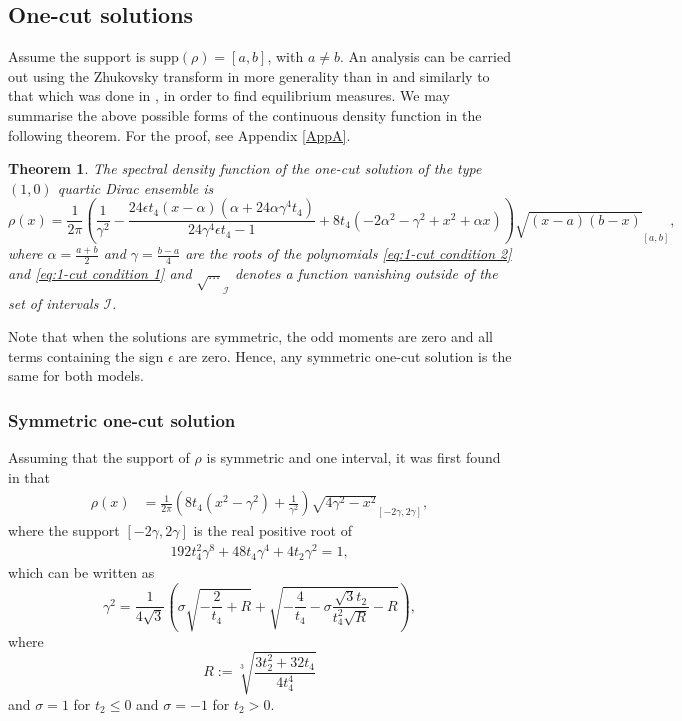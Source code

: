 \documentclass[10pt]{article}
\theoremstyle{plain}
\newtheorem{theorem}{Theorem}
\theoremstyle{definition}
\theoremstyle{plain}
\begin{document}
\subsection{One-cut solutions}
	Assume the support is $\text{supp} (\rho) = [a,b]$, with $a\not =b$. An analysis can be carried out using the Zhukovsky transform in more generality than in \cite{khalkhali2020phase} and similarly to that which was done in \cite{d2026symmetry}, in order to find equilibrium measures. We may summarise the above possible forms of the continuous density function in the following theorem. For the proof, see Appendix \ref{AppA}.
 
	\begin{theorem}\label{thm: one-cut density}
			The spectral density function of the one-cut solution of the type $(1,0)$  quartic Dirac ensemble is
		\begin{equation*}
		\rho(x) = \frac{1}{2\pi} \left(\frac{1}{\gamma ^2}-\frac{24 \epsilon t_{4} (x-\alpha ) \left(\alpha +24 \alpha \gamma ^4 t_4\right)}{24 \gamma ^4
 \epsilon t_{4}-1}+8 t_{4} \left(-2 \alpha ^2-\gamma ^2+x^2+\alpha x\right)\right)\sqrt{(x-a)(b-x)}_{[a,b]},
		\end{equation*}
 where $\alpha = \frac{a+b}{2}$ and $\gamma =\frac{b-a}{4}$ are the roots of the polynomials \eqref{eq:1-cut condition 2} and \eqref{eq:1-cut condition 1} and $\sqrt{\ldots}_\mathcal I$ denotes a function vanishing outside of the set of intervals $\mathcal I$.
	\end{theorem}

 Note that when the solutions are symmetric, the odd moments are zero and all terms containing the sign $\epsilon$ are zero. Hence, any symmetric one-cut solution is the same for both models. 

\subsubsection{Symmetric one-cut solution}
Assuming that the support of $\rho$ is symmetric and one interval, it was first found in \cite{khalkhali2020phase,d2022numerical} that
\begin{align*}
\rho(x)&= \frac{1}{2\pi}\left(8 t_{4}(x^2-\gamma^2) +\frac{1}{\gamma^2}\right)\sqrt{4\gamma^{2}-x^{2}}_{[-2\gamma,2\gamma]},
\end{align*}
where the support $[-2\gamma,2\gamma]$ is the real positive root of
\begin{align} \label{eq:1-cut tree equation}
192 t_{4}^2\gamma^8 + 48t_{4} \gamma^4 + 4t_{2} \gamma^2 = 1,
\end{align}
which can be written as 
\begin{equation*}
 \gamma^2 = \frac{1}{4 \sqrt{3}}\left(\sigma \sqrt{ -\frac{2}{t_{4}}+R}+\sqrt{ -\frac{4}{t_{4}}-\sigma \frac{\sqrt{3}t_{2}}{t_{4}^{2} \sqrt{R}} -R}\right),
\end{equation*}
where 
\begin{equation*}
 R :=\sqrt[3]{\frac{3 t_{2}^2 + 32 t_{4}}{4 t_{4}^{4}}}
\end{equation*}
and $\sigma = 1$ for $t_{2}\leq 0$ and $\sigma =-1$ for $t_{2}>0$. 
\end{document}
